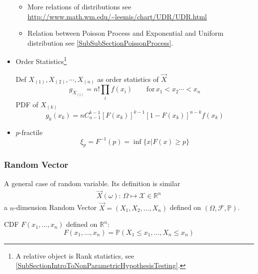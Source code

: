 \begin{itemize}
\begin{itemize}[topsep=2pt,itemsep=0pt]
            
            
            
            \item More relations of distributions see \url{http://www.math.wm.edu/~leemis/chart/UDR/UDR.html}
            \item Relation between Poisson Process and Exponential and Uniform distribution see \autoref{SubSubSectionPoissonProcess}.
            
            
        \end{itemize}
        
        \item Order Statistics\footnote{A relative object is Rank statistics, see \autoref{SubSectionIntroToNonParametricHypothesisTesting}.}
        
        Def $X_{(1)},X_{(2)},\cdots,X_{(n)}$ as order statistics of $\vec{X}$
        \begin{equation}    
            g_{X_{(i)}}=n!\prod_i f(x_i)\qquad \mathrm{for}\, x_1<x_2\cdots <x_n    
        \end{equation}
        PDF of $X_{(k)}$
        \begin{equation}\label{EqaDistributionOfOrderStatistics} 
            g_k(x_k)=nC_{n-1}^{k-1}[F(x_k)]^{k-1}[1-F(x_k)]^{n-k}f(x_k)
        \end{equation}
        \item $p$-fractile
        \begin{equation}    \xi_p=F^{-1}(p)=\inf\{x|F(x)\geq p\}\end{equation}
    \end{itemize}






\subsubsection{Random Vector}
    A general case of random variable. Its definition is similar    
    \begin{align}
        \vec{X}(\omega ):\, \Omega \mapsto \mathscr{X}\in\mathbb{R}^n 
    \end{align}
    a $n$-dimension Random Vector $\vec{X}=(X_1,X_2,\ldots,X_n)$ defined on $(\Omega,\mathscr{F},\mathbb{P})$.

    CDF $F(x_1,\ldots,x_n)$ defined on $\mathbb{R}^n$:
    \begin{equation}F(x_1,\ldots,x_n)=\mathbb{P}(X_1\leq x_1,\ldots,X_n\leq x_n)\end{equation}

